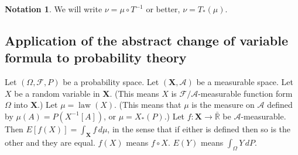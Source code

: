 \documentclass{article}
\DeclareMathOperator{\law}{law}
\newcommand{\R}{\mathbb{R}}
\newcommand{\F}{\mathscr{F}}
\theoremstyle{definition}
\newtheorem*{notation}{Notation}
\begin{document}
\begin{notation}
We will write $\nu = \mu \circ T^{-1}$ or better, $\nu = T_*(\mu)$.
\end{notation}

\subsection*{Application of the abstract change of variable formula to probability theory}

Let $(\Omega, \F, P)$ be a probability space. Let $(\mathbf{X}, \mathscr{A})$ be a measurable space. Let $X$ be a random variable in $\mathbf{X}$. (This means $X$ is $\mathscr{F}/\mathscr{A}$-measurable function form $\Omega$ into $\mathbf{X}$.)
Let $\mu = \law(X)$. (This means that $\mu$ is the measure on $\mathscr{A}$ defined by $\mu(A) = P(X^{-1}[A])$, or $\mu = X_*(P)$.)
Let $f : \mathbf{X} \longrightarrow \bar{\R}$ be $\mathscr{A}$-measurable. Then $E[f(X)] = \int_\mathbf{X} f\,d\mu$, in the sense that if either is defined then so is the other and they are equal. $f(X)$ means $f \circ X$. $E(Y)$ means $\int_\Omega Y\,dP$.
\end{document}
